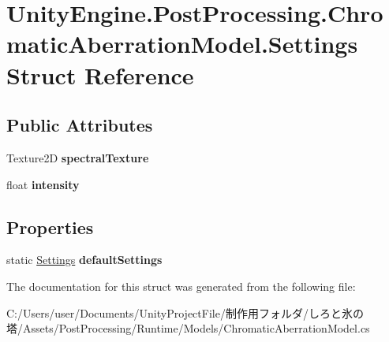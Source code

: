 \hypertarget{struct_unity_engine_1_1_post_processing_1_1_chromatic_aberration_model_1_1_settings}{}\section{Unity\+Engine.\+Post\+Processing.\+Chromatic\+Aberration\+Model.\+Settings Struct Reference}
\label{struct_unity_engine_1_1_post_processing_1_1_chromatic_aberration_model_1_1_settings}
\subsection*{Public Attributes}
\begin{DoxyCompactItemize}
\item 
\mbox{\label{struct_unity_engine_1_1_post_processing_1_1_chromatic_aberration_model_1_1_settings_aff651d22c776d0cb82929551f0b33005}} 
Texture2D {\bfseries spectral\+Texture}
\item 
\mbox{\label{struct_unity_engine_1_1_post_processing_1_1_chromatic_aberration_model_1_1_settings_ac7c815ce4c835bb54ff58e507af198bc}} 
float {\bfseries intensity}
\end{DoxyCompactItemize}
\subsection*{Properties}
\begin{DoxyCompactItemize}
\item 
\mbox{\label{struct_unity_engine_1_1_post_processing_1_1_chromatic_aberration_model_1_1_settings_aed16f622438648f1fa48c1fddb602013}} 
static \hyperlink{struct_unity_engine_1_1_post_processing_1_1_chromatic_aberration_model_1_1_settings}{Settings} {\bfseries default\+Settings}
\end{DoxyCompactItemize}


The documentation for this struct was generated from the following file\+:\begin{DoxyCompactItemize}
\item 
C\+:/\+Users/user/\+Documents/\+Unity\+Project\+File/制作用フォルダ/しろと氷の塔/\+Assets/\+Post\+Processing/\+Runtime/\+Models/Chromatic\+Aberration\+Model.\+cs\end{DoxyCompactItemize}
